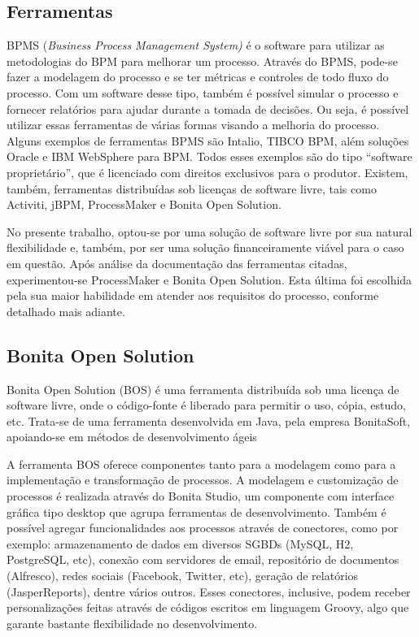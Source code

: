\documentclass[12pt]{article}
\begin{document}
\subsection{Ferramentas}

BPMS (\emph{Business Process Management System)} é o software para utilizar as metodologias do BPM para melhorar um processo. Através do BPMS, pode-se fazer a modelagem do processo e se ter métricas e controles de todo fluxo do processo. Com um software desse tipo, também é possível simular o processo e fornecer relatórios para ajudar durante a tomada de decisões. Ou seja, é possível utilizar essas ferramentas de várias formas visando a melhoria do processo. Alguns exemplos de ferramentas BPMS são Intalio, TIBCO BPM, além soluções Oracle e IBM WebSphere para BPM. Todos esses exemplos são do tipo “software proprietário”, que é licenciado com direitos exclusivos para o produtor. Existem, também, ferramentas distribuídas sob licenças de software livre, tais como Activiti, jBPM, ProcessMaker e Bonita Open Solution.

No presente trabalho, optou-se por uma solução de software livre por sua natural flexibilidade e, também, por ser uma solução financeiramente viável para o caso em questão. Após análise da documentação das ferramentas citadas, experimentou-se ProcessMaker e Bonita Open Solution. Esta última foi escolhida pela sua maior habilidade em atender aos requisitos do processo, conforme detalhado mais adiante.

\subsection{Bonita Open Solution}

Bonita Open Solution (BOS) é uma ferramenta distribuída sob uma licença de software livre, onde o código-fonte é liberado para permitir o uso, cópia, estudo, etc. Trata-se de uma ferramenta desenvolvida em Java, pela empresa BonitaSoft, apoiando-se em métodos de desenvolvimento ágeis~\cite{BONITASOFT}

A ferramenta BOS oferece componentes tanto para a modelagem como para a implementação e transformação de processos. A modelagem e customização de processos é realizada através do Bonita Studio, um componente com interface gráfica tipo desktop que agrupa ferramentas de desenvolvimento. Também é possível agregar funcionalidades aos processos através de conectores, como por exemplo: armazenamento de dados em diversos SGBDs (MySQL, H2, PostgreSQL, etc), conexão com servidores de email, repositório de documentos (Alfresco), redes sociais (Facebook, Twitter, etc), geração de relatórios (JasperReports), dentre vários outros. Esses conectores, inclusive, podem receber personalizações feitas através de códigos escritos em linguagem Groovy, algo que garante bastante flexibilidade no desenvolvimento.
\end{document}
